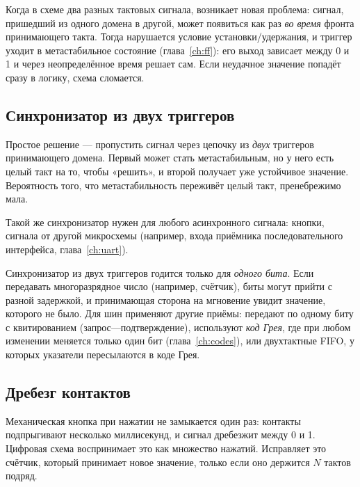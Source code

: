 Когда в схеме два разных тактовых сигнала, возникает новая проблема:
сигнал, пришедший из одного домена в другой, может появиться как раз
\emph{во время} фронта принимающего такта. Тогда нарушается условие
установки/удержания, и триггер уходит в метастабильное состояние
(глава~\ref{ch:ff}): его выход зависает между 0 и 1 и через неопределённое время
решает сам. Если неудачное значение попадёт сразу в логику, схема
сломается.

\subsection{Синхронизатор из двух триггеров}

Простое решение --- пропустить сигнал через цепочку из \emph{двух} триггеров
принимающего домена. Первый может стать метастабильным, но у него есть
целый такт на то, чтобы «решить», и второй получает уже устойчивое
значение. Вероятность того, что метастабильность переживёт целый такт,
пренебрежимо мала.



Такой же синхронизатор нужен для любого асинхронного сигнала: кнопки,
сигнала от другой микросхемы (например, входа приёмника последовательного
интерфейса, глава~\ref{ch:uart}).

\begin{warnbox}
Синхронизатор из двух триггеров годится только для \emph{одного бита}. Если
передавать многоразрядное число (например, счётчик), биты могут
прийти с разной задержкой, и принимающая сторона на мгновение увидит
значение, которого не было. Для шин применяют другие приёмы: передают по
одному биту с квитированием (запрос---подтверждение), используют \emph{код
Грея}, где при любом изменении меняется только один бит
(глава~\ref{ch:codes}), или двухтактные FIFO, у которых указатели
пересылаются в коде Грея.
\end{warnbox}

\subsection{Дребезг контактов}

Механическая кнопка при нажатии не замыкается один раз: контакты
подпрыгивают несколько миллисекунд, и сигнал дребезжит между 0 и 1. Цифровая
схема воспринимает это как множество нажатий. Исправляет это счётчик, который
принимает новое значение, только если оно держится $N$ тактов подряд.

